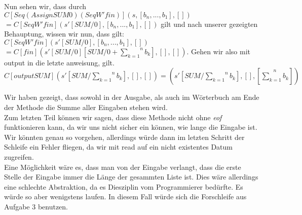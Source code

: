 \documentclass[11pt,a4paper,ngerman]{article}
\begin{document}
Nun sehen wir, dass durch $C[Seq (Assign SUM 0) (Seq W' fin)](s,[b_{n},...,b_1],[])$\\ 
$= C[Seq W' fin](s'[SUM/0],[b_n,...,b_1],[])$ 
gilt und nach unserer gezeigten Behauptung, wissen wir nun, dass gilt:
$C[Seq W' fin](s'[SUM/0],[b_n,...,b_1],[]) $\\
$= C[fin](s'[SUM/0][SUM/0+\overset{n}{\underset{k=1}{\sum}} b_k],[],[])$. Gehen wir also mit output in die letzte anweisung, gilt.
$C[output SUM](s'[SUM/\overset{n}{\underset{k=1}{\sum}} b_k],[],[]) = (s'[SUM/\overset{n}{\underset{k=1}{\sum}} b_k], [], [\overset{n}{\underset{k=1}{\sum} b_k}])$

Wir haben gezeigt, dass sowohl in der Ausgabe, als auch im Wörterbuch am Ende der Methode die Summe aller Eingaben stehen wird.\\

Zum letzten Teil können wir sagen, dass diese Methode nicht ohne \emph{eof} funktionieren kann, da wir uns nicht sicher ein können, wie lange die Eingabe ist. Wir könnten genau so vorgehen, allerdings würde dann im letzten Schritt der Schleife ein Fehler fliegen, da wir mit read auf ein nicht existentes Datum zugreifen.\\

Eine Möglichkeit wäre es, dass man von der Eingabe verlangt, dass die erste Stelle der Eingabe immer die Länge der gesammten Liste ist. Dies wäre allerdings eine schlechte Abstraktion, da es Diesziplin vom Programmierer bedürfte. Es würde so aber wenigstens laufen. In diesem Fall würde sich die Forschleife aus Aufgabe 3 benutzen.

\label{LastPage}
\end{document}
